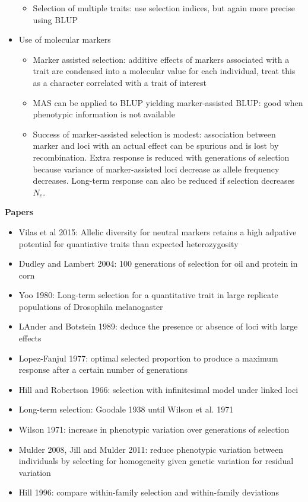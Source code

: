 \documentclass[12pt]{amsart}
\begin{document}
\begin{itemize}
\begin{itemize}
\item Selection of multiple traits: use selection indices, but again more precise using BLUP
\end{itemize}
\item Use of molecular markers
\begin{itemize}
\item Marker assisted selection: additive effects of markers associated with a trait are condensed into a molecular value for each individual, treat this as a character correlated with a trait of interest
\item MAS can be applied to BLUP yielding marker-assisted BLUP: good when phenotypic information is not available 
\item Success of marker-assisted selection is modest: association between marker and loci with an actual effect can be spurious and is lost by recombination. Extra response is reduced with generations of selection because variance of marker-assisted loci decrease as allele frequency decreases. Long-term response can also be reduced if selection decreases $N_e$. 
\end{itemize}
\end{itemize}

{\large \bf Papers}
\begin{itemize}
\item Vilas et al 2015: Allelic diversity for neutral markers retains a high adpative potential for quantiative traits than expected heterozygosity
\item Dudley and Lambert 2004: 100 generations of selection for oil and protein in corn
\item Yoo 1980: Long-term selection for a quantitative trait in large replicate populations of Drosophila melanogaster
\item LAnder and Botstein 1989: deduce the presence or absence of loci with large effects 
\item Lopez-Fanjul 1977: optimal selected proportion to produce a maximum response after a certain number of generations
\item Hill and Robertson 1966: selection with infinitesimal model under linked loci 
\item Long-term selection: Goodale 1938 until Wilson et al. 1971
\item Wilson 1971: increase in phenotypic variation over generations of selection 
\item Mulder 2008, Jill and Mulder 2011: reduce phenotypic variation between individuals by selecting for homogeneity given genetic variation for residual variation 
\item Hill 1996: compare within-family selection and within-family deviations 
\end{itemize}
\end{document}
